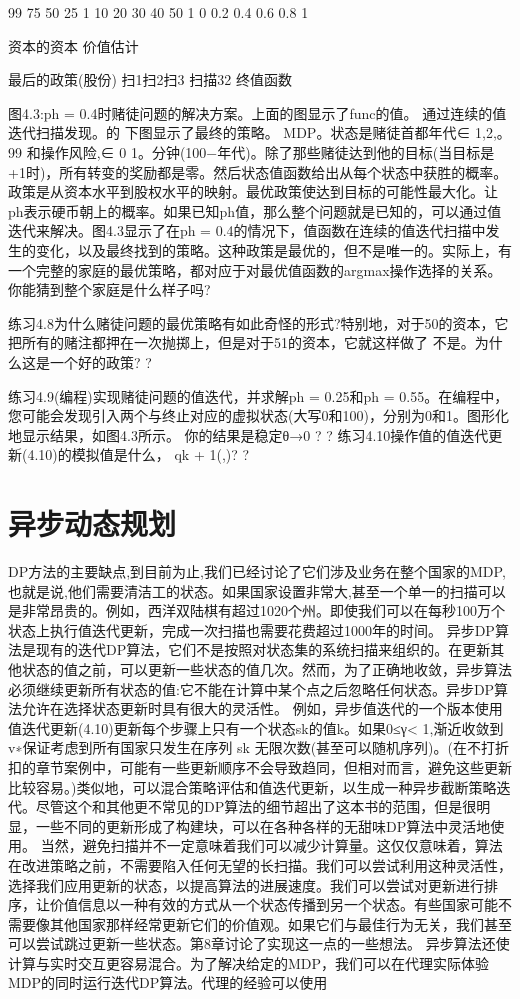 99 75 50 25 1
10 20 30 40 50
1 0
0.2 0.4 0.6 0.8
1

资本的资本
价值估计

最后的政策(股份)
扫1扫2扫3
扫描32
终值函数

图4.3:ph = 0.4时赌徒问题的解决方案。上面的图显示了func的值。
通过连续的值迭代扫描发现。的
下图显示了最终的策略。
MDP。状态是赌徒首都年代∈{ 1,2,。99 }和操作风险,∈{ 0 1。分钟(100−年代)}。除了那些赌徒达到他的目标(当目标是+1时)，所有转变的奖励都是零。然后状态值函数给出从每个状态中获胜的概率。政策是从资本水平到股权水平的映射。最优政策使达到目标的可能性最大化。让ph表示硬币朝上的概率。如果已知ph值，那么整个问题就是已知的，可以通过值迭代来解决。图4.3显示了在ph = 0.4的情况下，值函数在连续的值迭代扫描中发生的变化，以及最终找到的策略。这种政策是最优的，但不是唯一的。实际上，有一个完整的家庭的最优策略，都对应于对最优值函数的argmax操作选择的关系。你能猜到整个家庭是什么样子吗?

练习4.8为什么赌徒问题的最优策略有如此奇怪的形式?特别地，对于50的资本，它把所有的赌注都押在一次抛掷上，但是对于51的资本，它就这样做了
不是。为什么这是一个好的政策? 					?

练习4.9(编程)实现赌徒问题的值迭代，并求解ph = 0.25和ph = 0.55。在编程中，您可能会发现引入两个与终止对应的虚拟状态(大写0和100)，分别为0和1。图形化地显示结果，如图4.3所示。
你的结果是稳定θ→0 ? 					?
练习4.10操作值的值迭代更新(4.10)的模拟值是什么，
qk + 1(,)? 					?
\section{异步动态规划}
DP方法的主要缺点,到目前为止,我们已经讨论了它们涉及业务在整个国家的MDP,也就是说,他们需要清洁工的状态。如果国家设置非常大,甚至一个单一的扫描可以是非常昂贵的。例如，西洋双陆棋有超过1020个州。即使我们可以在每秒100万个状态上执行值迭代更新，完成一次扫描也需要花费超过1000年的时间。
异步DP算法是现有的迭代DP算法，它们不是按照对状态集的系统扫描来组织的。在更新其他状态的值之前，可以更新一些状态的值几次。然而，为了正确地收敛，异步算法必须继续更新所有状态的值:它不能在计算中某个点之后忽略任何状态。异步DP算法允许在选择状态更新时具有很大的灵活性。
例如，异步值迭代的一个版本使用值迭代更新(4.10)更新每个步骤上只有一个状态sk的值k。如果0≤γ< 1,渐近收敛到v∗保证考虑到所有国家只发生在序列{ sk }无限次数(甚至可以随机序列)。(在不打折扣的章节案例中，可能有一些更新顺序不会导致趋同，但相对而言，避免这些更新比较容易。)类似地，可以混合策略评估和值迭代更新，以生成一种异步截断策略迭代。尽管这个和其他更不常见的DP算法的细节超出了这本书的范围，但是很明显，一些不同的更新形成了构建块，可以在各种各样的无甜味DP算法中灵活地使用。
当然，避免扫描并不一定意味着我们可以减少计算量。这仅仅意味着，算法在改进策略之前，不需要陷入任何无望的长扫描。我们可以尝试利用这种灵活性，选择我们应用更新的状态，以提高算法的进展速度。我们可以尝试对更新进行排序，让价值信息以一种有效的方式从一个状态传播到另一个状态。有些国家可能不需要像其他国家那样经常更新它们的价值观。如果它们与最佳行为无关，我们甚至可以尝试跳过更新一些状态。第8章讨论了实现这一点的一些想法。
异步算法还使计算与实时交互更容易混合。为了解决给定的MDP，我们可以在代理实际体验MDP的同时运行迭代DP算法。代理的经验可以使用


